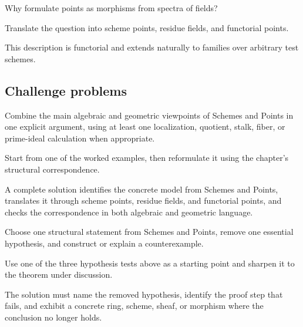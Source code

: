 \begin{exercise}\label{exr:vi21-expand-14}
Why formulate points as morphisms from spectra of fields?
\end{exercise}
\begin{hint}
Translate the question into scheme points, residue fields, and functorial points.
\end{hint}
\begin{solution}
This description is functorial and extends naturally to families over arbitrary test schemes.
\end{solution}

\subsection*{Challenge problems}

\begin{exercise}\label{exr:vi21-expand-15}
Combine the main algebraic and geometric viewpoints of Schemes and Points in one explicit argument, using at least one localization, quotient, stalk, fiber, or prime-ideal calculation when appropriate.
\end{exercise}
\begin{hint}
Start from one of the worked examples, then reformulate it using the chapter's structural correspondence.
\end{hint}
\begin{solution}
A complete solution identifies the concrete model from Schemes and Points, translates it through scheme points, residue fields, and functorial points, and checks the correspondence in both algebraic and geometric language.
\end{solution}

\begin{exercise}\label{exr:vi21-expand-16}
Choose one structural statement from Schemes and Points, remove one essential hypothesis, and construct or explain a counterexample.
\end{exercise}
\begin{hint}
Use one of the three hypothesis tests above as a starting point and sharpen it to the theorem under discussion.
\end{hint}
\begin{solution}
The solution must name the removed hypothesis, identify the proof step that fails, and exhibit a concrete ring, scheme, sheaf, or morphism where the conclusion no longer holds.
\end{solution}

